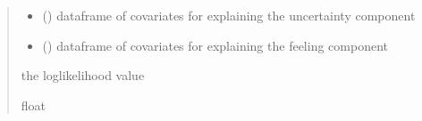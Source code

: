 \documentclass[letterpaper,10pt,english]{sphinxmanual}
\begin{document}
\begin{fulllineitems}
\begin{quote}
\begin{description}
\begin{itemize}
\item {} 
\sphinxAtStartPar
{} () \textendash{} dataframe of covariates for explaining the uncertainty component

\item {} 
\sphinxAtStartPar
{} () \textendash{} dataframe of covariates for explaining the feeling component

\end{itemize}

\sphinxAtStartPar
the log\sphinxhyphen{}likelihood value

\sphinxAtStartPar
float

\end{description}\end{quote}

\end{fulllineitems}

\end{document}
